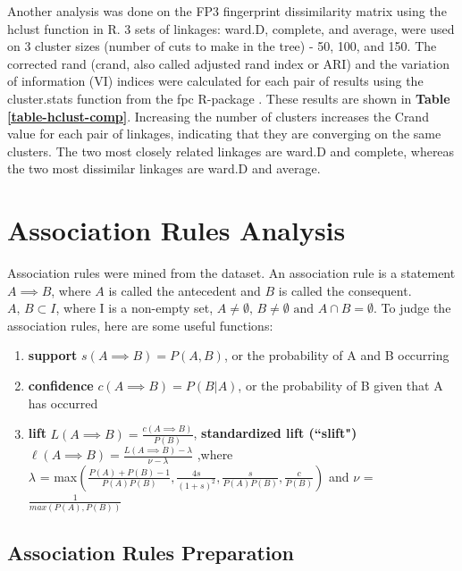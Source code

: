 \documentclass[11pt]{article}
\begin{document}
Another analysis was done on the FP3 fingerprint dissimilarity matrix using the hclust function in R. 3 sets of linkages: ward.D, complete, and average, were used on 3 cluster sizes (number of cuts to make in the tree) - 50, 100, and 150. The corrected rand (crand, also called adjusted rand index or ARI) and the variation of information (VI) indices were calculated for each pair of results using the cluster.stats function from the fpc R-package \cite{r-fpc}. These results are shown in \textbf{Table \ref{table-hclust-comp}}. Increasing the number of clusters increases the Crand value for each pair of linkages, indicating that they are converging on the same clusters. The two most closely related linkages are ward.D and complete, whereas the two most dissimilar linkages are ward.D and average.

\section{Association Rules Analysis}

Association rules were mined from the dataset. An association rule is a statement $A \implies B$, where $A$ is called the antecedent and $B$ is called the consequent. $A \text{, } B \subset I$, where I is a non-empty set, $A\ne \emptyset \text{, } B\neq \emptyset \text{ and } A\cap B=\emptyset$. To judge the association rules, here are some useful functions: 

\begin{enumerate}
    \item \textbf{support} $s(A\implies B) = P(A,B)$, or the probability of A and B occurring
    \item \textbf{confidence} $c(A\implies B) = P(B|A)$, or the probability of B given that A has occurred
    \item \textbf{lift} $L(A\implies B) = \frac{c(A\implies B)}{P(B)}$, \textbf{standardized lift (``slift")} $\ell (A\implies B) = \frac{L(A\implies B)-\lambda}{\nu - \lambda}$
    ,where\\ \textbf{$\lambda$} = max$(\frac{P(A)+P(B)-1}{P(A)P(B)}, \frac{4s}{(1+s)^2}, \frac{s}{P(A)P(B)},\frac{c}{P(B)})$ and  \textbf{$\nu$} = $\frac{1}{max(P(A),P(B))}$
\end{enumerate}

\subsection{Association Rules Preparation}
\end{document}
